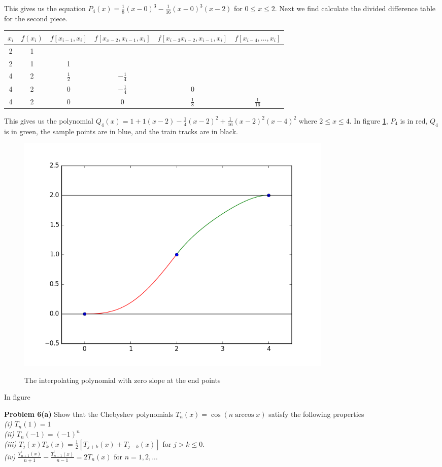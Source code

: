 \documentclass[12pt]{article}
\newcommand{\problem}[1]{\hspace{-4 ex} \large \textbf{Problem #1} }
\begin{document}
	This gives us the equation $P_4(x) = \tfrac{1}{8}(x-0)^3 - \tfrac{1}{16}(x-0)^3(x-2)$ for $0 \leq x \leq 2$. Next we find calculate the divided difference table for the second piece.
	\begin{center}
		\begin{tabular}{|c|c|c|c|c|c|}\hline
			$x_i$ & $f(x_i)$ & $f[x_{i-1},x_i]$ & $f[x_{x-2}, x_{i-1}, x_i]$ & $f[ x_{i-3}x_{i-2}, x_{i-1}, x_i]$ & $f[ x_{i-4},\dots, x_i]$ \\ \hline
			2 & 1 & & & & \\ \hline
			2 & 1 & 1 & & & \\ \hline
			4 & 2 & $\tfrac{1}{2}$ & $-\tfrac{1}{4}$ & & \\ \hline
			4 & 2 & 0 & $-\tfrac{1}{4}$ & 0 & \\ \hline
			4 & 2 & 0 &  0 & $\tfrac{1}{8}$ & $\tfrac{1}{16}$ \\ \hline
		\end{tabular}
	\end{center}
	This gives us the polynomial $Q_4(x) = 1 + 1(x-2) - \tfrac{1}{4}(x-2)^2 + \tfrac{1}{16}(x-2)^2(x-4)^2$ where $2 \leq x \leq 4$. In figure \ref{fig:p5c}, $P_4$ is in red, $Q_4$ is in green, the sample points are in blue, and the train tracks are in black. \bigbreak
	\begin{figure}[H]
		\caption{The interpolating polynomial with zero slope at the end points}
		\includegraphics[width=0.75\textwidth]{hw4_figure_7}
		\centering
		\label{fig:p5c}
	\end{figure}
	In figure 

	
	

\problem{6(a)} Show that the Chebyshev polynomials $T_n(x)=\cos{(n \arccos{x})}$ satisfy the following properties \\
\emph{(i)} $T_n(1) = 1$ \\
\emph{(ii)} $T_n(-1) = (-1)^n$ \\
\emph{(iii)} $T_j(x)T_k(x) = \tfrac{1}{2}[T_{j+k}(x) + T_{j-k}(x)]$ for $j>k\leq 0$. \\
\emph{(iv)} $\frac{T_{n+1}^\prime(x)}{n+1} - \frac{T_{n-1}^\prime(x)}{n-1} = 2T_n(x)$ for $n=1, 2, ...$ \\
\end{document}
